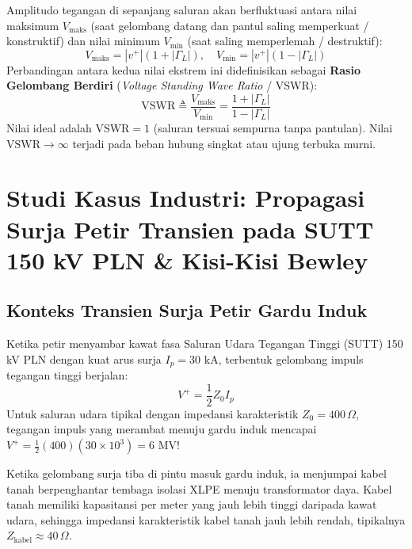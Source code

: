 \documentclass[11pt,a4paper]{article}
\theoremstyle{definition}
\begin{document}
Amplitudo tegangan di sepanjang saluran akan berfluktuasi antara nilai maksimum $V_{\text{maks}}$ (saat gelombang datang dan pantul saling memperkuat / konstruktif) dan nilai minimum $V_{\text{min}}$ (saat saling memperlemah / destruktif):
\begin{equation}
    V_{\text{maks}} = |v^+| (1 + |\Gamma_L|), \quad V_{\text{min}} = |v^+| (1 - |\Gamma_L|)
\end{equation}
Perbandingan antara kedua nilai ekstrem ini didefinisikan sebagai \textbf{Rasio Gelombang Berdiri} (\textit{Voltage Standing Wave Ratio} / VSWR):
\begin{equation}
    \text{VSWR} \triangleq \frac{V_{\text{maks}}}{V_{\text{min}}} = \frac{1 + |\Gamma_L|}{1 - |\Gamma_L|}
    \label{eq:vswr_formula}
\end{equation}
Nilai ideal adalah $\text{VSWR} = 1$ (saluran tersuai sempurna tanpa pantulan). Nilai $\text{VSWR} \to \infty$ terjadi pada beban hubung singkat atau ujung terbuka murni.

\section{Studi Kasus Industri: Propagasi Surja Petir Transien pada SUTT 150 kV PLN \& Kisi-Kisi Bewley}

\subsection{Konteks Transien Surja Petir Gardu Induk}
Ketika petir menyambar kawat fasa Saluran Udara Tegangan Tinggi (SUTT) 150 kV PLN dengan kuat arus surja $I_p = 30\text{ kA}$, terbentuk gelombang impuls tegangan tinggi berjalan:
\begin{equation}
    V^+ = \frac{1}{2} Z_0 I_p
\end{equation}
Untuk saluran udara tipikal dengan impedansi karakteristik $Z_0 = 400\,\Omega$, tegangan impuls yang merambat menuju gardu induk mencapai $V^+ = \frac{1}{2}(400)(30 \times 10^3) = 6\text{ MV}$!

Ketika gelombang surja tiba di pintu masuk gardu induk, ia menjumpai kabel tanah berpenghantar tembaga isolasi XLPE menuju transformator daya. Kabel tanah memiliki kapasitansi per meter yang jauh lebih tinggi daripada kawat udara, sehingga impedansi karakteristik kabel tanah jauh lebih rendah, tipikalnya $Z_{\text{kabel}} \approx 40\,\Omega$.
\end{document}
